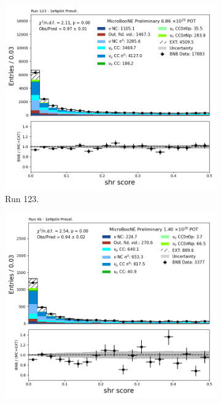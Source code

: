 \begin{figure}[H]
    \centering
    \begin{subfigure}[t]{0.32\linewidth}
        \includegraphics[width=\linewidth]{technote/Appendix_Preselection/Figures/1eNp0pi/Run123/shr_score_Run123_1eNp0pi_Presel.png}
        \caption{Run 123.}
    \end{subfigure}%
    \hspace{0.2cm}%
    \begin{subfigure}[t]{0.32\linewidth}
        \includegraphics[width=\linewidth]{technote/Appendix_Preselection/Figures/1eNp0pi/Run4b/shr_score_Run4b_1eNp0pi_Presel.png}

\end{subfigure}
\end{figure}

